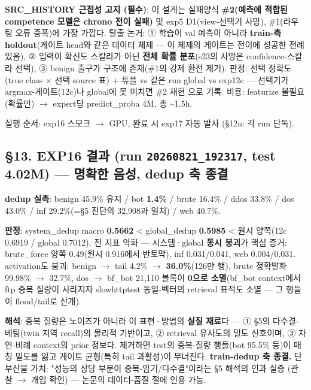 \textbf{SRC\_\allowbreak{}HISTORY 근접성 고지 (필수)}: 이 설계는 실패양식 \textbf{\#2(예측에 적합된 competence 모델은 chrono 전이 실패)} 및 exp5 D1(view-선택기 사망), \#1(라우팅 오류 증폭)에 가장 가깝다. 탈출 논거: ① 학습이 val 예측이 아니라 \textbf{train-측 holdout}(게이트 head와 같은 데이터 체제 — 이 체제의 게이트는 전이에 성공한 전례 있음), ② 입력이 확신도 스칼라가 아닌 \textbf{전체 확률 분포}(s23의 사망은 confidence-스칼라 선택), ③ benign 출구가 구조에 존재(\#1의 강제 환전 제거). 판정: 선택 정확도(true class × 선택 source 표) +\allowbreak{} 튜플 vs 같은 run global vs exp12c — 선택기가 argmax-게이트(12c)나 global에 못 미치면 \#2 재현 으로 기록. 비용: featurize 불필요(확률만)  \ensuremath{\rightarrow}  expert당 predict\_\allowbreak{}proba 4M, 총 \textasciitilde{}1.5h.

실행 순서: exp16 스모크 \ensuremath{\rightarrow} GPU, 완료 시 exp17 자동 발사 (§12n: 각 run 단독).

\subsection{§13. EXP16 결과 (run \texttt{20260821\allowbreak{}\_\allowbreak{}\allowbreak{}192317}, test 4.02M) — 명확한 음성, dedup 축 종결}
\textbf{dedup 실측}: benign 45.9\% 유지 /\allowbreak{} bot \textbf{1.4\%} /\allowbreak{} brute 16.4\% /\allowbreak{} ddos 33.8\% /\allowbreak{} dos 43.0\% /\allowbreak{} inf 29.2\%(=\allowbreak{}§5 진단의 32,908과 일치) /\allowbreak{} web 40.7\%.

\textbf{판정}: system\_\allowbreak{}dedup macro \textbf{0.5662} < global\_\allowbreak{}dedup \textbf{0.5985} < 원시 양쪽(12c 0.6919 /\allowbreak{} global 0.7012). 전 지표 악화 — 시스템·global \textbf{동시 붕괴}가 핵심 증거: brute\_\allowbreak{}force 양쪽 0.49(원시 0.916에서 반토막), inf 0.031/\allowbreak{}0.041, web 0.004/\allowbreak{}0.031. activation도 붕괴: benign \ensuremath{\rightarrow} tail 4.2\% \ensuremath{\rightarrow} \textbf{36.0\%}(126만 행), brute 정확발화 99.98\% \ensuremath{\rightarrow} 32.7\%, dos \ensuremath{\rightarrow} bf\_\allowbreak{}bot 21,110 블록이 \textbf{0으로 소멸}(bf\_\allowbreak{}bot context에서 ftp 중복 질량이 사라지자 slowhttptest 동일-벡터의 retrieval 표적도 소멸 — 그 행들이 flood/\allowbreak{}tail로 산개).

\textbf{해석}: 중복 질량은 노이즈가 아니라 이 표현·방법의 \textbf{실질 재료}다 — ① §5의 다수결-베팅(twin 지역 recall)의 물리적 기반이고, ② retrieval 유사도의 밀도 신호이며, ③ 자연-비례 context의 prior 정보다. 제거하면 test의 중복-질량 행들(bot 95.5\% 등)이 매칭 밀도를 잃고 게이트 균형(특히 tail 과활성)이 무너진다. \textbf{train-dedup 축 종결.} 단 부산물 가치: "성능의 상당 부분이 중복-암기/\allowbreak{}다수결"이라는 §5 해석의 인과 실증 (관찰 \ensuremath{\rightarrow} 개입 확인) — 논문의 데이터-품질 절에 인용 가능.

